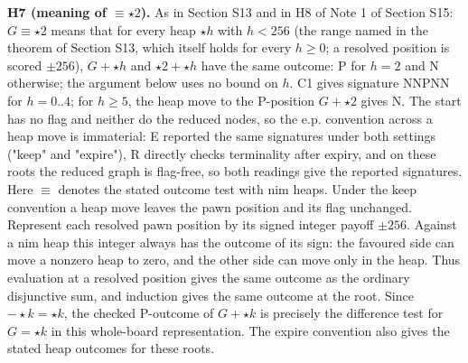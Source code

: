 \textbf{H7 (meaning of $\equiv\star2$).} As in Section S13 and in H8 of Note 1 of Section S15: $G\equiv\star2$ means that for every heap $\star h$ with $h<256$ (the range named in the theorem of Section S13, which itself holds for every $h\ge0$; a resolved position is scored $\pm256$), $G+\star h$ and $\star2+\star h$ have the same outcome: P for $h=2$ and N otherwise; the argument below uses no bound on $h$. C1 gives signature NNPNN for $h=0..4$; for $h\ge5$, the heap move to the P-position $G+\star2$ gives N. The start has no flag and neither do the reduced nodes, so the e.p. convention across a heap move is immaterial: E reported the same signatures under both settings ("keep" and "expire"), R directly checks terminality after expiry, and on these roots the reduced graph is flag-free, so both readings give the reported signatures. Here $\equiv$ denotes the stated outcome test with nim heaps. Under the keep convention a heap move leaves the pawn position and its flag unchanged. Represent each resolved pawn position by its signed integer payoff $\pm256$. Against a nim heap this integer always has the outcome of its sign: the favoured side can move a nonzero heap to zero, and the other side can move only in the heap. Thus evaluation at a resolved position gives the same outcome as the ordinary disjunctive sum, and induction gives the same outcome at the root. Since $-\star k=\star k$, the checked P-outcome of $G+\star k$ is precisely the difference test for $G=\star k$ in this whole-board representation. The expire convention also gives the stated heap outcomes for these roots.


